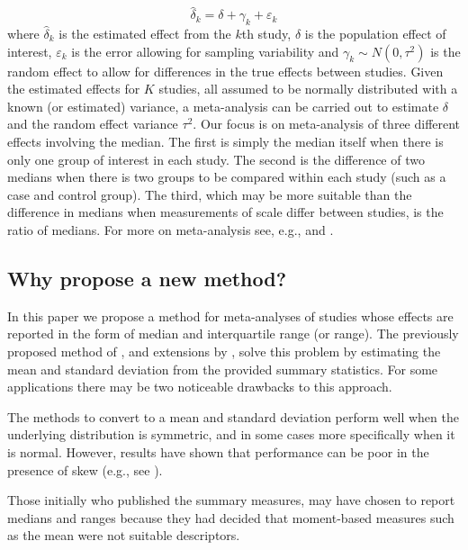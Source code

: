 \documentclass{article}
\begin{document}
\begin{equation}
\widehat{\delta}_k=\delta + \gamma_k + \varepsilon_k
\end{equation}
where $\widehat{\delta}_k$ is the estimated effect from the $k$th study, $\delta$ is the population effect of interest, $\varepsilon_k$ is the error allowing for sampling variability and $\gamma_k\sim N(0,\tau^2)$ is the random effect to allow for differences in the true effects between studies.  Given the estimated effects for $K$ studies, all assumed to be normally distributed with a known (or estimated) variance, a meta-analysis can be carried out to estimate $\delta$ and the random effect variance $\tau^2$.  Our focus is on meta-analysis of three different effects involving the median.  The first is simply the median itself when there is only one group of interest in each study.  The second is the difference of two medians when there is two groups to be compared within each study (such as a case and control group).  The third, which may be more suitable than the difference in medians when measurements of scale differ between studies, is the ratio of medians.   For more on meta-analysis see, e.g., \cite{borenstein2008introduction} and \cite{kulinskaya2008meta}.

\subsection{Why propose a new method?}

In this paper we propose a method for meta-analyses of studies whose effects are reported in the form of median and interquartile range (or range). The previously proposed method of \cite{Hozo2005}, and extensions by \cite{Bland2015, Wan2014}, solve this problem by estimating the mean and standard deviation from the provided summary statistics. For some applications there may be two noticeable drawbacks to this approach.

\begin{disadv}\label{disadv:1}
The methods to convert to a mean and standard deviation perform well when the underlying distribution is symmetric, and in some cases more specifically when it is normal.  However, results have shown that performance can be poor in the presence of skew (e.g., see \cite{shi2018estimate}).
\end{disadv}

\begin{disadv}\label{disadv:2}
Those initially who published the summary measures, may have chosen to report medians and ranges because they had decided that moment-based measures such as the mean were not suitable descriptors.
\end{disadv}
\end{document}
